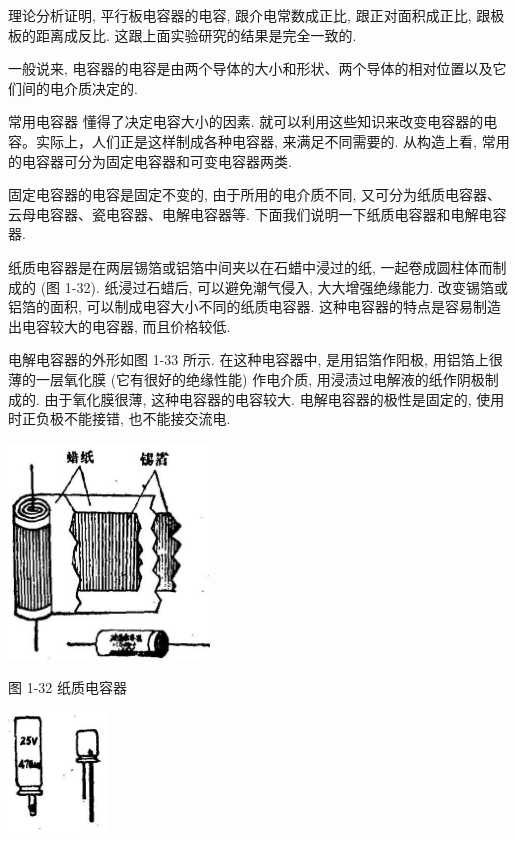 \documentclass[10pt]{article}
\begin{document}
理论分析证明, 平行板电容器的电容, 跟介电常数成正比, 跟正对面积成正比, 跟极板的距离成反比. 这跟上面实验研究的结果是完全一致的.

一般说来, 电容器的电容是由两个导体的大小和形状、两个导体的相对位置以及它们间的电介质决定的.

常用电容器 懂得了决定电容大小的因素. 就可以利用这些知识来改变电容器的电容。实际上，人们正是这样制成各种电容器, 来满足不同需要的. 从构造上看, 常用的电容器可分为固定电容器和可变电容器两类.

固定电容器的电容是固定不变的, 由于所用的电介质不同, 又可分为纸质电容器、云母电容器、瓷电容器、电解电容器等. 下面我们说明一下纸质电容器和电解电容器.

纸质电容器是在两层锡箔或铝箔中间夹以在石蜡中浸过的纸, 一起卷成圆柱体而制成的 (图 1-32). 纸浸过石蜡后, 可以避免潮气侵入, 大大增强绝缘能力. 改变锡箔或铝箔的面积, 可以制成电容大小不同的纸质电容器. 这种电容器的特点是容易制造出电容较大的电容器, 而且价格较低.

电解电容器的外形如图 1-33 所示. 在这种电容器中, 是用铝箔作阳极, 用铝箔上很薄的一层氧化膜 (它有很好的绝缘性能) 作电介质, 用浸渍过电解液的纸作阴极制成的. 由于氧化膜很薄, 这种电容器的电容较大. 电解电容器的极性是固定的, 使用时正负极不能接错, 也不能接交流电.

\begin{center}
\includegraphics[max width=0.4\textwidth]{images/01913056-1f15-74d8-9184-9aab52c9d66b_47_534512.jpg}
\end{center}

图 1-32 纸质电容器

\begin{center}
\includegraphics[max width=0.2\textwidth]{images/01913056-1f15-74d8-9184-9aab52c9d66b_47_838616.jpg}
\end{center}
\end{document}
